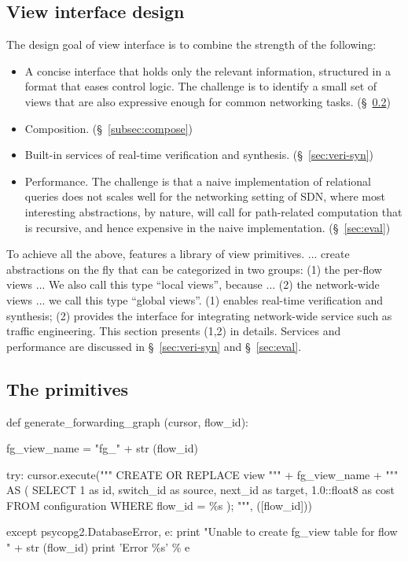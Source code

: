 \label{sec:details}

\subsection{View interface design}

The design goal of \Sys view interface is to combine the strength of
the following:
\begin{itemize}
\item A concise interface that holds only the relevant information,
  structured in a format that eases control logic. The challenge is to
  identify a small set of views that are also expressive enough for
  common networking tasks. (\S~\ref{subsec:view-library})
\item Composition. (\S~\ref{subsec:compose})
\item Built-in services of real-time verification and
  synthesis. (\S~\ref{sec:veri-syn})
\item Performance. The challenge is that a naive implementation of
  relational queries does not scales well for the networking setting
  of SDN, where most interesting abstractions, by nature, will call
  for path-related computation that is recursive, and hence expensive
  in the naive implementation. (\S~\ref{sec:eval})
\end{itemize}

To achieve all the above, \Sys features a library of view primitives.
... create abstractions on the fly that can be categorized in two
groups: (1) the per-flow views ... We also call this type ``local
views'', because ... (2) the network-wide views ... we call this type
``global views''.  (1) enables real-time verification and synthesis;
(2) provides the interface for integrating network-wide service such
as traffic engineering.  This section presents (1,2) in
details. Services and performance are discussed in
\S~\ref{sec:veri-syn} and \S~\ref{sec:eval}.


\subsection{The primitives}
\label{subsec:view-library}


\begin{sql}
def generate_forwarding_graph (cursor, flow_id):

    fg_view_name = "fg_" + str (flow_id)

    try:
        cursor.execute("""
        CREATE OR REPLACE view """ + fg_view_name + """ AS (
        SELECT 1 as id,
               switch_id as source,
	       next_id as target,
	       1.0::float8 as cost
        FROM configuration
        WHERE flow_id = \%s
        );
        """, ([flow_id]))

    except psycopg2.DatabaseError, e:
        print "Unable to create fg_view table for flow " + str (flow_id)
        print 'Error \%s' \% e    
\end{sql}

